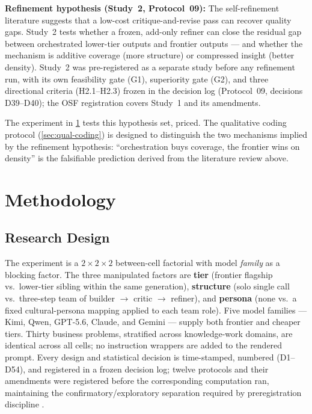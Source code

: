 \documentclass[12pt,a4paper]{article}
\begin{document}
\medskip
\noindent\textbf{Refinement hypothesis (Study~2, Protocol~09):} The
self-refinement literature \citep{ShinnEtAl2023} suggests that a low-cost
critique-and-revise pass can recover quality gaps. Study~2 tests whether a
frozen, add-only refiner can close the residual gap between orchestrated
lower-tier outputs and frontier outputs --- and whether the mechanism is
additive coverage (more structure) or compressed insight (better density).
Study~2 was pre-registered as a separate study before any refinement run,
with its own feasibility gate (G1), superiority gate (G2), and three
directional criteria (H2.1--H2.3) frozen in the decision log (Protocol~09,
decisions D39--D40); the OSF registration covers Study~1 and its amendments.

The experiment in \cref{sec:method} tests this hypothesis set, priced. The
qualitative coding protocol (\cref{sec:qual-coding}) is designed to distinguish
the two mechanisms implied by the refinement hypothesis: ``orchestration buys
coverage, the frontier wins on density'' is the falsifiable prediction derived
from the literature review above.


\section{Methodology}\label{sec:method}

\subsection{Research Design}

The experiment is a $2 \times 2 \times 2$ between-cell factorial with model
\emph{family} as a blocking factor. The three manipulated factors are
\textbf{tier} (frontier flagship vs.\ lower-tier sibling within the same
generation), \textbf{structure} (solo single call vs.\ three-step team of
builder $\to$ critic $\to$ refiner), and \textbf{persona} (none vs.\ a fixed
cultural-persona mapping applied to each team role). Five model families ---
Kimi, Qwen, GPT-5.6, Claude, and Gemini --- supply both frontier and cheaper
tiers. Thirty business problems, stratified across knowledge-work domains,
are identical across all cells; no instruction wrappers are added to the
rendered prompt. Every design and statistical decision is time-stamped, numbered
(D1--D54), and registered in a frozen decision log; twelve protocols and their
amendments were registered before the corresponding computation ran, maintaining
the confirmatory/exploratory separation required by preregistration discipline
\citep{NosekEtAl2018}.
\end{document}

